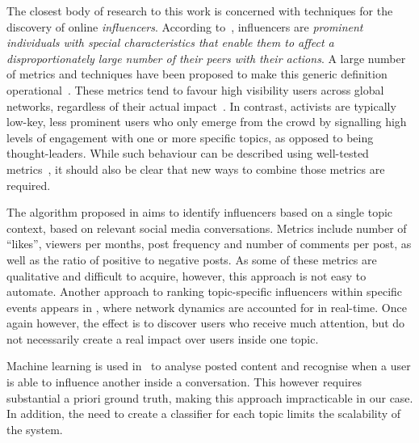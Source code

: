 The closest body of research to this work is concerned with techniques for the discovery of online \textit{influencers}. 
According to~\cite{Kardara2015}, influencers are \textit{prominent individuals with special characteristics that enable them to	affect a disproportionately large number of their peers with their actions}.
%
A large number of metrics and techniques have been proposed to make this generic definition operational~\cite{RIQUELME2016949}. 
%
These metrics tend to favour high visibility users across global networks, regardless of their actual impact~\cite{Cha2010MeasuringUI}. 
%
In contrast, activists are typically low-key, less prominent users who only emerge from the crowd by signalling high levels of engagement with one or more specific topics, as opposed to being thought-leaders. 
%
While such behaviour can be described  using well-tested metrics~\cite{RIQUELME2016949}, it should also be clear that new ways to combine those metrics are required.

The algorithm proposed in \cite{MATIC2011} aims to identify influencers based on a single topic context, based on relevant social media conversations.
Metrics include number of ``likes'', viewers per months, post frequency and  number of comments per post, as well as the ratio of positive to negative posts.
As some of these metrics are qualitative and difficult to acquire, however, this approach is not easy to automate.
%
Another approach to ranking topic-specific influencers within specific events appears in  \cite{Kardara2015}, where network dynamics are accounted for in real-time.
Once again however, the effect is to discover users who receive much attention, but do not necessarily create a real impact over users inside one topic.

Machine learning is used in~\cite{Biran2012} to analyse posted content and recognise when a user is able to influence another  inside a conversation.
This however requires substantial a priori ground truth, making this approach impracticable in our case. In addition, the need to create a classifier for each topic limits the scalability of the system.

	
